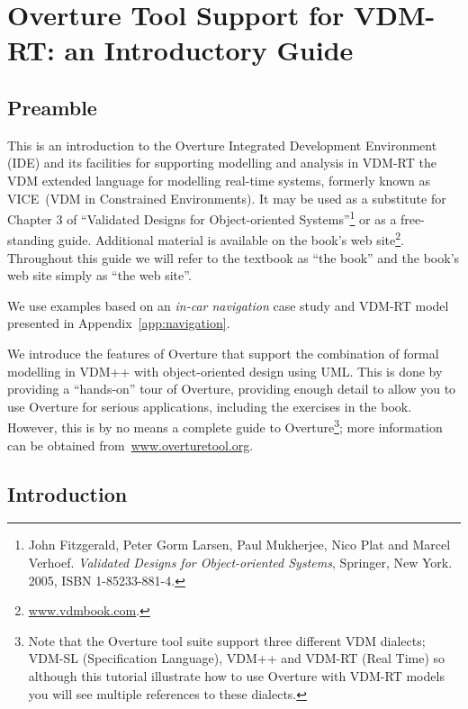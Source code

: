 \chapter{Overture Tool Support for VDM-RT: an Introductory Guide}\label{cha:toolbox}
\initexercise

\section*{Preamble}

This is an introduction to the Overture Integrated Development
Environment (IDE) and its facilities for supporting modelling and
analysis in VDM-RT the VDM extended language for modelling real-time
systems, formerly known as VICE~(VDM in Constrained Environments). It
may be used as a substitute for Chapter 3 of ``Validated Designs for
Object-oriented Systems''\footnote{John Fitzgerald, Peter Gorm Larsen,
  Paul Mukherjee, Nico Plat and Marcel Verhoef. \emph{Validated
    Designs for Object-oriented Systems}, Springer, New York. 2005,
  ISBN 1-85233-881-4.} or as a free-standing guide. Additional material
is available on the book's web
site\footnote{\url{www.vdmbook.com}.}. Throughout this guide we will refer to
the textbook as ``the book'' and the book's web site simply as ``the
web site''.

We use examples based on an \emph{in-car navigation} case study and
VDM-RT model presented in Appendix~\ref{app:navigation}. 

We introduce the features of Overture that support the combination of
formal modelling in VDM++ with object-oriented design using UML. This
is done by providing a ``hands-on'' tour of Overture, providing enough
detail to allow you to use Overture for serious applications,
including the exercises in the book. However, this is by no means a
complete guide to Overture\footnote{Note that the Overture tool suite support three
  different VDM dialects; VDM-SL (Specification Language), VDM++ and
  VDM-RT (Real Time) so although this tutorial illustrate how to use
  Overture with VDM-RT models you will see multiple references to
  these dialects.}; more information can be obtained
from~\url{www.overturetool.org}.



\section{Introduction}

